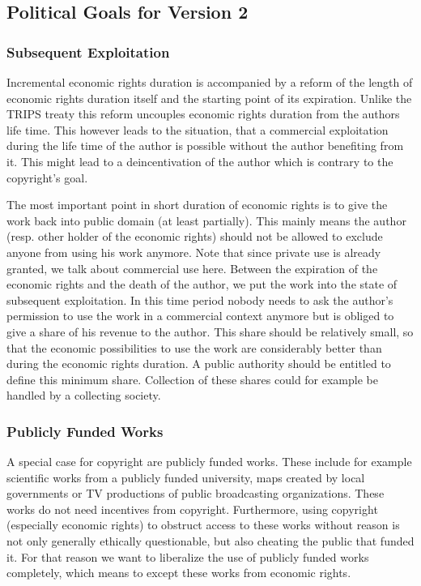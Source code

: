 \subsection{Political Goals for Version 2}

\subsubsection{Subsequent Exploitation}

Incremental economic rights duration is accompanied by a reform of the length of economic rights duration itself and the starting point of its expiration. Unlike the TRIPS treaty this reform uncouples economic rights duration from the authors life time. This however leads to the situation, that a commercial exploitation during the life time of the author is possible without the author benefiting from it. This might lead to a deincentivation of the author which is contrary to the copyright's goal.

The most important point in short duration of economic rights is to give the work back into public domain (at least partially). This mainly means the author (resp. other holder of the economic rights) should not be allowed to exclude anyone from using his work anymore. Note that since private use is already granted, we talk about commercial use here. Between the expiration of the economic rights and the death of the author, we put the work into the state of subsequent exploitation. In this time period nobody needs to ask the author's permission to use the work in a commercial context anymore but is obliged to give a share of his revenue to the author. This share should be relatively small, so that the economic possibilities to use the work are considerably better than during the economic rights duration. A public authority should be entitled to define this minimum share. Collection of these shares could for example be handled by a collecting society.

\subsubsection{Publicly Funded Works}

A special case for copyright are publicly funded works. These include for example scientific works from a publicly funded university, maps created by local governments or TV productions of public broadcasting organizations. These works do not need incentives from copyright. Furthermore, using copyright (especially economic rights) to obstruct access to these works without reason is not only generally ethically questionable, but also cheating the public that funded it. For that reason we want to liberalize the use of publicly funded works completely, which means to except these works from economic rights.


